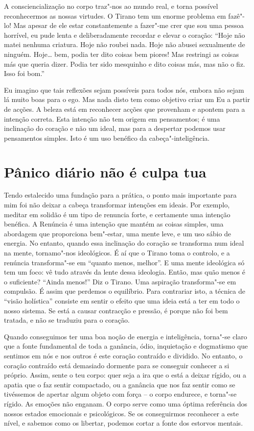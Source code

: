 A consciencialização no corpo traz"-nos ao mundo real, e torna possível
reconhecermos as nossas virtudes. O Tirano tem um enorme problema em
fazê"-lo! Mas apesar de ele estar constantemente a fazer"-me crer que sou
uma pessoa horrível, eu pude lenta e deliberadamente recordar e elevar o
coração: “Hoje não matei nenhuma criatura. Hoje não roubei nada. Hoje
não abusei sexualmente de ninguém. Hoje\ldots{} bem, podia ter dito coisas
bem piores! Mas restringi as coisas más que queria dizer. Podia ter sido
mesquinho e dito coisas más, mas não o fiz. Isso foi bom.”

Eu imagino que tais reflexões sejam possíveis para todos nós, embora não
sejam lá muito boas para o ego. Mas nada disto tem como objetivo criar
um Eu a partir de acções. A beleza está em reconhecer acções que
provenham e apontem para a intenção correta. Esta intenção não tem
origem em pensamentos; é uma inclinação do coração e não um ideal, mas
para a despertar podemos usar pensamentos simples. Isto é um uso
benéfico da cabeça"-inteligência.

\section{Pânico diário não é culpa
tua}

Tendo estalecido uma fundação para a prática, o ponto mais importante
para mim foi não deixar a cabeça transformar intenções em ideais. Por
exemplo, meditar em solidão é um tipo de renuncia forte, e certamente
uma intenção benéfica. A Renúncia é uma intenção que mantém as coisas
simples, uma abordagem que proporciona bem"-estar, uma mente leve, e um
uso sábio de energia. No entanto, quando essa inclinação do coração se
transforma num ideal na mente, tornamo"-nos ideológicos. É aí que o
Tirano toma o controlo, e a renúncia transforma"-se em “quanto menos,
melhor”. E uma mente ideológica só tem um foco: vê tudo através da lente
dessa ideologia. Então, mas quão menos é o suficiente? “Ainda menos!”
Diz o Tirano. Uma aspiração transforma"-se em compulsão. É assim que
perdemos o equilíbrio. Para contrariar isto, a técnica de “visão
holística” consiste em sentir o efeito que uma ideia está a ter em todo
o nosso sistema. Se está a causar contracção e pressão, é porque não foi
bem tratada, e não se traduziu para o coração.

Quando conseguimos ter uma boa noção de energia e inteligência, torna"-se
claro que a fonte fundamental de toda a ganância, ódio, inquietação e
dogmatismo que sentimos em nós e nos outros é este coração contraído e
dividido. No entanto, o coração contraído está demasiado dormente para
se conseguir conhecer a si próprio. Assim, sente o teu corpo: quer seja
a ira que o está a deixar rígido, ou a apatia que o faz sentir
compactado, ou a ganância que nos faz sentir como se tivéssemos de
apertar algum objeto com força -- o corpo endurece, e torna"-se rígido.
As emoções não enganam. O corpo serve como uma óptima referência dos
nossos estados emocionais e psicológicos. Se os conseguirmos reconhecer
a este nível, e sabemos como os libertar, podemos cortar a fonte dos
estorvos mentais.

